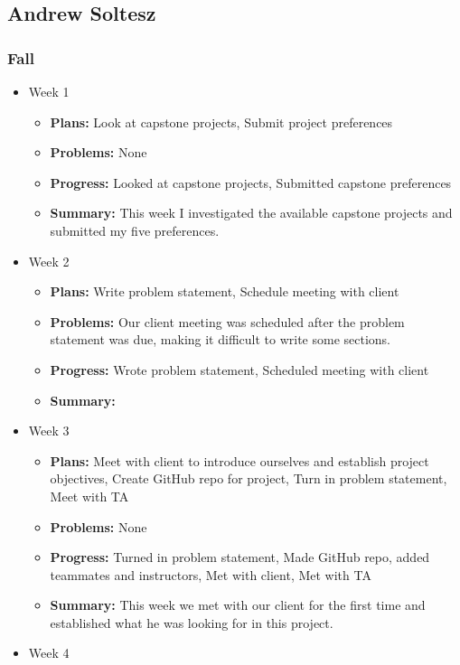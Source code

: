 \documentclass[onecolumn, draftclsnofoot,10pt, compsoc]{IEEEtran}
\def \GroupMemberTwo{			Andrew Soltesz			}
\begin{document}
\subsection{\GroupMemberTwo}
\subsubsection{Fall}
\begin{itemize}
\item Week 1
	\begin{itemize}
	\item \textbf{Plans:} Look at capstone projects, Submit project preferences
    \item \textbf{Problems:} None
    \item \textbf{Progress:} Looked at capstone projects, Submitted capstone preferences
    \item \textbf{Summary:} This week I investigated the available capstone projects and submitted my five preferences.
	\end{itemize}
\item Week 2
	\begin{itemize}
	\item \textbf{Plans:} Write problem statement, Schedule meeting with client
    \item \textbf{Problems:} Our client meeting was scheduled after the problem statement was due, making it difficult to write some sections.
    \item \textbf{Progress:} Wrote problem statement, Scheduled meeting with client
    \item \textbf{Summary:}
	\end{itemize}
\item Week 3
	\begin{itemize}
	\item \textbf{Plans:} Meet with client to introduce ourselves and establish project objectives, Create GitHub repo for project, Turn in problem statement, Meet with TA
    \item \textbf{Problems:} None
    \item \textbf{Progress:} Turned in problem statement, Made GitHub repo, added teammates and instructors, Met with client, Met with TA
    \item \textbf{Summary:} This week we met with our client for the first time and established what he was looking for in this project. 
	\end{itemize}
\item Week 4
	\begin{itemize}

\end{itemize}
\end{itemize}
\end{document}
